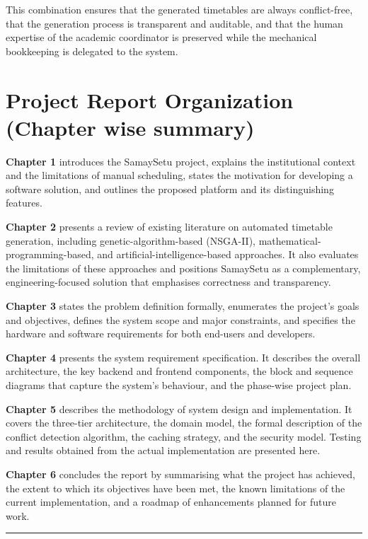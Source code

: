This combination ensures that the generated timetables are always conflict-free, that the generation process is transparent and auditable, and that the human expertise of the academic coordinator is preserved while the mechanical bookkeeping is delegated to the system.

\section{Project Report Organization (Chapter wise summary)}

\textbf{Chapter 1} introduces the SamaySetu project, explains the institutional context and the limitations of manual scheduling, states the motivation for developing a software solution, and outlines the proposed platform and its distinguishing features.

\textbf{Chapter 2} presents a review of existing literature on automated timetable generation, including genetic-algorithm-based (NSGA-II), mathematical-programming-based, and artificial-intelligence-based approaches. It also evaluates the limitations of these approaches and positions SamaySetu as a complementary, engineering-focused solution that emphasises correctness and transparency.

\textbf{Chapter 3} states the problem definition formally, enumerates the project's goals and objectives, defines the system scope and major constraints, and specifies the hardware and software requirements for both end-users and developers.

\textbf{Chapter 4} presents the system requirement specification. It describes the overall architecture, the key backend and frontend components, the block and sequence diagrams that capture the system's behaviour, and the phase-wise project plan.

\textbf{Chapter 5} describes the methodology of system design and implementation. It covers the three-tier architecture, the domain model, the formal description of the conflict detection algorithm, the caching strategy, and the security model. Testing and results obtained from the actual implementation are presented here.

\textbf{Chapter 6} concludes the report by summarising what the project has achieved, the extent to which its objectives have been met, the known limitations of the current implementation, and a roadmap of enhancements planned for future work.

\vspace{10mm}
\hrule
